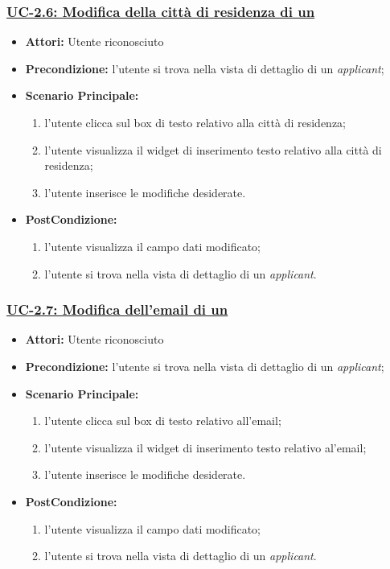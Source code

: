 \subsubsection{\underline{UC-2.6: Modifica della città di residenza di un \applicant}}
\begin{itemize}
	\item \textbf{Attori:} Utente riconosciuto
	\item \textbf{Precondizione:}  l'utente si trova nella vista di dettaglio di un \textit{applicant};
	\item \textbf{Scenario Principale:}
	\begin{enumerate}
		\item l'utente clicca sul box di testo relativo alla città di residenza;
		\item l'utente visualizza il  widget di inserimento testo relativo alla città di residenza;
		\item l'utente inserisce le modifiche desiderate.
	\end{enumerate}
	\item \textbf{PostCondizione:} 
	\begin{enumerate}
		\item l'utente visualizza il campo dati modificato;
		\item l'utente si trova nella vista di dettaglio di un \textit{applicant}.
	\end{enumerate}
	
\end{itemize}

\subsubsection{\underline{UC-2.7: Modifica dell'email di un \applicant}}
\begin{itemize}
	\item \textbf{Attori:} Utente riconosciuto
	\item \textbf{Precondizione:}  l'utente si trova nella vista di dettaglio di un \textit{applicant};
	\item \textbf{Scenario Principale:}
	\begin{enumerate}
		\item l'utente clicca sul box di testo relativo all'email;
		\item l'utente visualizza il  widget di inserimento testo relativo al'email;
		\item l'utente inserisce le modifiche desiderate.
	\end{enumerate}
	\item \textbf{PostCondizione:} 
	\begin{enumerate}
		\item l'utente visualizza il campo dati modificato;
		\item l'utente si trova nella vista di dettaglio di un \textit{applicant}.
	\end{enumerate}
	
\end{itemize}

